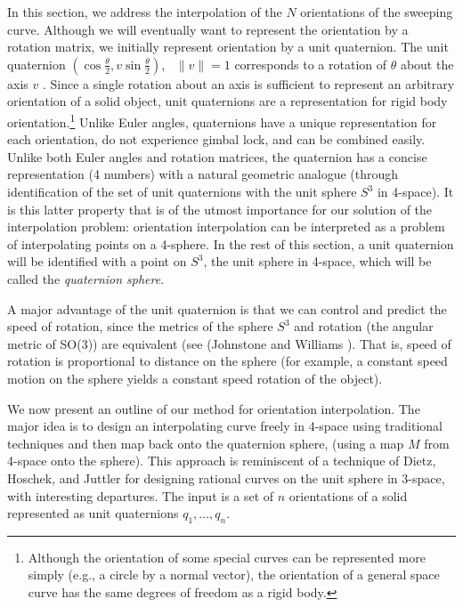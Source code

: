 In this section, we address the interpolation of the $N$ orientations
of the sweeping curve.
Although we will eventually want to represent the orientation 
by a rotation matrix, we initially 
represent orientation by a unit quaternion.
The unit quaternion
$(\cos \frac{\theta}{2}, v \sin \frac{\theta}{2})$, \ $\|v\| = 1$
corresponds to a rotation of $\theta$ about the axis $v$ 
\cite{hoschek+lasser93}.
Since a single rotation about an axis is sufficient
to represent an arbitrary orientation of a solid object,
unit quaternions are a representation for rigid body 
orientation.\footnote{Although the orientation of some special curves
     can be represented more simply (e.g., a circle by a normal 
     vector), the orientation of a general space curve has the same degrees
     of freedom as a rigid body.}
Unlike Euler angles, quaternions have a unique representation 
for each orientation, do not experience gimbal lock, and can be
combined easily.
Unlike both Euler angles and rotation matrices,
the quaternion has a concise representation (4 numbers) with a natural
geometric analogue (through identification of the set of unit quaternions 
with the unit sphere $S^3$ in 4-space).
It is this latter property that is of the utmost importance for 
our solution of the
interpolation problem: orientation interpolation can be interpreted as
a problem of interpolating points on a 4-sphere.
In the rest of this section, a unit quaternion will be identified
with a point on $S^3$, the unit sphere in 4-space, which will be
called the {\em quaternion sphere}.

A major advantage of the unit quaternion is that we can 
control and predict the speed of rotation,
since the metrics of the sphere $S^3$ and rotation (the angular metric of
SO(3)) are equivalent (see (Johnstone and Williams \cite{jjjimbo94a}).
That is, speed of rotation is proportional to distance on the sphere
(for example, a constant speed motion on the sphere yields a constant
speed rotation of the object).

We now present an outline of our method for orientation interpolation.
The major idea is to design an interpolating curve freely in 4-space
using traditional techniques and then map back onto the quaternion sphere,
(using a map $M$ from 4-space onto the sphere).
This approach is reminiscent of a technique of Dietz, Hoschek, and Juttler 
\cite{dietz93} for designing rational curves on the unit sphere in 3-space,
with interesting departures.
The input is a set of $n$ orientations of a solid
represented as unit quaternions $q_1,\ldots,q_n$.

